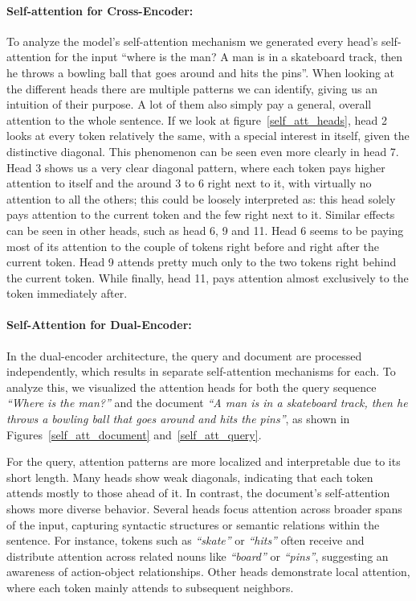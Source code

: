 \documentclass[runningheads]{llncs}
\begin{document}
\paragraph{Self-attention for Cross-Encoder:} To analyze the model's self-attention mechanism we generated every head's self-attention for the input ``where is the man? A man is in a skateboard track, then he throws a bowling ball that goes around and hits the pins''. When looking at the different heads there are multiple patterns we can identify, giving us an intuition of their purpose. A lot of them also simply pay a general, overall attention to the whole sentence. If we look at figure~\ref{self_att_heads}, head 2 looks at every token relatively the same, with a special interest in itself, given the distinctive diagonal. This phenomenon can be seen even more clearly in head 7. Head 3 shows us a very clear diagonal pattern, where each token pays higher attention to itself and the around 3 to 6 right next to it, with virtually no attention to all the others; this could be loosely interpreted as: this head solely pays attention to the current token and the few right next to it. Similar effects can be seen in other heads, such as head 6, 9 and 11. Head 6 seems to be paying most of its attention to the couple of tokens right before and right after the current token. Head 9 attends pretty much only to the two tokens right behind the current token. While finally, head 11, pays attention almost exclusively to the token immediately after.

\vspace{2\baselineskip plus 0.5\baselineskip minus 0.5\baselineskip} %

\paragraph{Self-Attention for Dual-Encoder:} 
In the dual-encoder architecture, the query and document are processed independently, which results in separate self-attention mechanisms for each. To analyze this, we visualized the attention heads for both the query sequence \textit{``Where is the man?''} and the document \textit{``A man is in a skateboard track, then he throws a bowling ball that goes around and hits the pins''}, as shown in Figures~\ref{self_att_document} and~\ref{self_att_query}.

For the query, attention patterns are more localized and interpretable due to its short length. Many heads show weak diagonals, indicating that each token attends mostly to those ahead of it.
In contrast, the document's self-attention shows more diverse behavior. Several heads focus attention across broader spans of the input, capturing syntactic structures or semantic relations within the sentence. For instance, tokens such as \textit{``skate''} or \textit{``hits''} often receive and distribute attention across related nouns like \textit{``board''} or \textit{``pins''}, suggesting an awareness of action-object relationships. Other heads demonstrate local attention, where each token mainly attends to subsequent neighbors.
\end{document}
